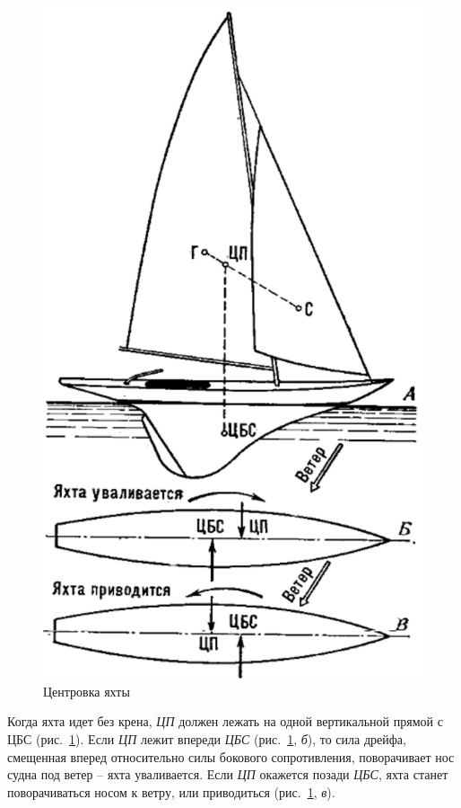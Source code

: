 \documentclass[a4paper, 12pt, twoside, final]{scrbook}
\begin{document}
\begin{figure}[htbp]
   \centering
   \includegraphics{pics/99_Centrovka_yakhty} %
   \caption{Центровка яхты}
   \label{fig:99}
\end{figure}

Когда яхта идет без крена, \textit{ЦП} должен лежать на одной вертикальной прямой с ЦБС (рис.~\ref{fig:99}). Если \textit{ЦП} лежит впереди \textit{ЦБС} (рис.~\ref{fig:99}, \textit{б}), то сила дрейфа, смещенная вперед относительно силы бокового сопротивления, поворачивает нос судна под ветер \--- яхта уваливается. Если \textit{ЦП} окажется позади \textit{ЦБС}, яхта станет поворачиваться носом к ветру, или приводиться (рис.~\ref{fig:99}, \textit{в}).
\end{document}
